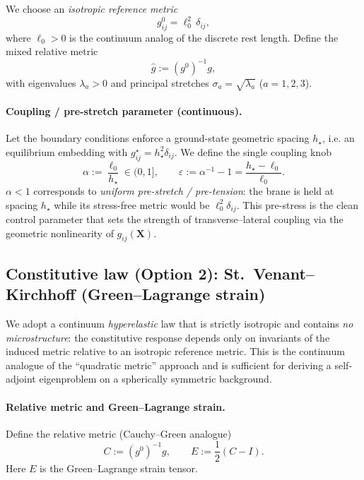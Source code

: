 \documentclass[11pt,a4paper]{article}
\begin{document}
We choose an \emph{isotropic reference metric}
\begin{equation}
  g^0_{ij}=\ell_0^2\,\delta_{ij},
  \label{eq:reference_metric}
\end{equation}
where $\ell_0>0$ is the continuum analog of the discrete rest length.
Define the mixed relative metric
\begin{equation}
  \widehat g := (g^0)^{-1}g,
  \label{eq:relative_metric}
\end{equation}
with eigenvalues $\lambda_a>0$ and principal stretches
$\sigma_a=\sqrt{\lambda_a}$ ($a=1,2,3$).

\paragraph{Coupling / pre-stretch parameter (continuous).}
Let the boundary conditions enforce a ground-state geometric spacing $h_\star$,
i.e. an equilibrium embedding with $g^\star_{ij}=h_\star^2\delta_{ij}$.
We define the single coupling knob
\begin{equation}
  \alpha := \frac{\ell_0}{h_\star}\in(0,1],\qquad
  \varepsilon := \alpha^{-1}-1=\frac{h_\star-\ell_0}{\ell_0}.
  \label{eq:coupling_alpha}
\end{equation}
$\alpha<1$ corresponds to \emph{uniform pre-stretch / pre-tension}:
the brane is held at spacing $h_\star$ while its stress-free metric would be
$\ell_0^2\delta_{ij}$. This pre-stress is the clean control parameter that
sets the strength of transverse--lateral coupling via the geometric nonlinearity
of $g_{ij}(\mathbf{X})$.

\subsection{Constitutive law (Option 2): St.\ Venant--Kirchhoff (Green--Lagrange strain)}
\label{subsec:stvk}

We adopt a continuum \emph{hyperelastic} law that is strictly isotropic and contains \emph{no microstructure}:
the constitutive response depends only on invariants of the induced metric relative to an isotropic reference metric.
This is the continuum analogue of the ``quadratic metric'' approach and is sufficient for deriving a self-adjoint
eigenproblem on a spherically symmetric background.

\paragraph{Relative metric and Green--Lagrange strain.}
Define the relative metric (Cauchy--Green analogue)
\[
C := (g^0)^{-1}g,
\qquad
E := \frac12(C-I).
\]
Here \(E\) is the Green--Lagrange strain tensor.
\end{document}
